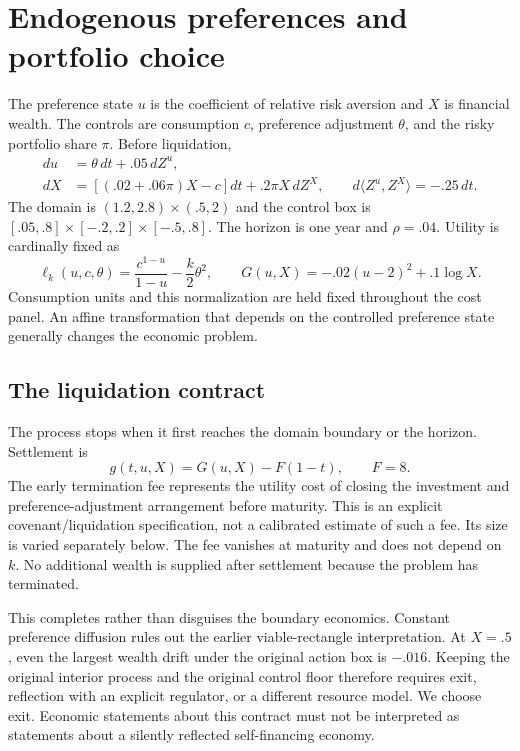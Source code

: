 \section{Endogenous preferences and portfolio choice}
\label{sec:ndu}
The preference state $u$ is the coefficient of relative risk aversion and $X$ is financial wealth. The controls are consumption $c$, preference adjustment $\theta$, and the risky portfolio share $\pi$. Before liquidation,
\begin{align}
du&=\theta\,dt+.05\,dZ^u,\\
dX&=[(.02+.06\pi)X-c]dt+.2\pi X\,dZ^X,
\qquad d\langle Z^u,Z^X\rangle=-.25\,dt.\label{eq:ndu-state}
\end{align}
The domain is $(1.2,2.8)\times(.5,2)$ and the control box is
$[.05,.8]\times[-.2,.2]\times[-.5,.8]$. The horizon is one year and $\rho=.04$. Utility is cardinally fixed as
\[
\ell_k(u,c,\theta)=\frac{c^{1-u}}{1-u}-\frac{k}{2}\theta^2,
\qquad G(u,X)=-.02(u-2)^2+.1\log X.
\]
Consumption units and this normalization are held fixed throughout the cost panel. An affine transformation that depends on the controlled preference state generally changes the economic problem.

\subsection{The liquidation contract}
The process stops when it first reaches the domain boundary or the horizon. Settlement is
\begin{equation}
g(t,u,X)=G(u,X)-F(1-t),\qquad F=8.
\label{eq:settlement}
\end{equation}
The early termination fee represents the utility cost of closing the investment and preference-adjustment arrangement before maturity. This is an explicit covenant/liquidation specification, not a calibrated estimate of such a fee. Its size is varied separately below. The fee vanishes at maturity and does not depend on $k$. No additional wealth is supplied after settlement because the problem has terminated.

This completes rather than disguises the boundary economics. Constant preference diffusion rules out the earlier viable-rectangle interpretation. At $X=.5$, even the largest wealth drift under the original action box is $-.016$. Keeping the original interior process and the original control floor therefore requires exit, reflection with an explicit regulator, or a different resource model. We choose exit. Economic statements about this contract must not be interpreted as statements about a silently reflected self-financing economy.

